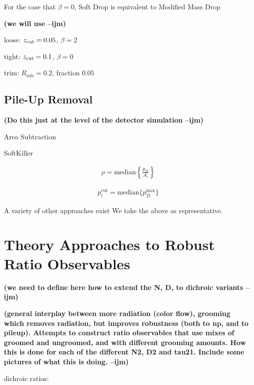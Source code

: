 \documentclass[11pt,letterpaper]{article}
\newcommand{\zcut}{z_{\rm cut}}
\newcommand{\ijm}[1]{\textbf{\textcolor{llblue}{(#1 --ijm)}}}
\begin{document}
For the case that $\beta=0$, Soft Drop is equivalent to Modified Mass Drop \cite{Dasgupta:2013ihk}

\ijm{we will use }

loose: $\zcut=0.05$, $\beta=2$

tight: $\zcut=0.1$, $\beta=0$

trim: $R_{\text{sub}}=0.2$, fraction $0.05$



\subsection{Pile-Up Removal}

\ijm{Do this just at the level of the  detector simulation}

Area Subtraction\cite{Cacciari:2007fd}\cite{Cacciari:2008gn}

SoftKiller \cite{Cacciari:2014gra}

\begin{align}
\rho= \text{median} \left \{ \frac{p_{Ti}}{A_i}   \right \}
\end{align}

\begin{align}
p_t^{\text{cut}}=\text{median} \{ p_{Ti}^{\text{max}} \}
\end{align}

A variety of other approaches exist \cite{Bertolini:2014bba}\cite{Krohn:2013lba}   We take the above as representative.


\section{Theory Approaches to Robust Ratio Observables}\label{sec:hybrid_ratio}

\ijm{we need to define here how to extend the N, D, to dichroic variants}


\ijm{general interplay between more radiation (color flow), grooming which removes radiation, but improves robustness (both to np, and to pileup). Attempts to construct ratio observables that use mixes of groomed and ungroomed, and with different grooming amounts. How this is done for each of the different N2, D2 and tau21. Include some pictures of what this is doing. }

dichroic ratios:\cite{Salam:2016yht}
\end{document}
